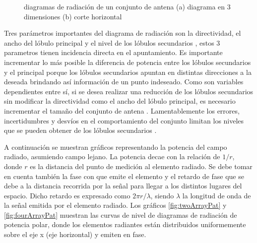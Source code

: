 \begin{figure}[H]
 \centering
	\caption{diagramas de radiación de un conjunto de antena (a) diagrama en 3 dimensiones \cite{arrayPattern} (b) corte horizontal}
 \label{fig:arrayPattern}
\end{figure}

Tres parámetros importantes del diagrama de radiación son la directividad, el ancho del lóbulo principal y el nivel de los
lóbulos secundarios \cite{Hsiao1985}, estos 3 parametros tienen incidencia directa en el apuntamiento. Es importante incrementar
lo más posible la diferencia de potencia entre los lóbulos secundarios y el principal porque los lóbulos secundarios apuntan
en distintas direcciones a la deseada brindando así información de un punto indeseado. Como son variables dependientes entre
sí, si se desea realizar una reducción de los lóbulos secundarios sin modificar la directividad como el ancho del lóbulo 
principal, es necesario incrementar el tamaño del conjunto de antena \cite{Hsiao1985}. 
Lamentablemente los errores, incertidumbres y desvíos en el comportamiento del conjunto limitan los niveles que se pueden 
obtener de los lóbulos secundarios \cite{Hsiao1985}.

A continuación se muestran gráficos representando la potencia del campo radiado, asumiendo campo lejano. La potencia decae
con la relación de $1/r$, donde $r$ es la distancia del punto de medición al elemento radiado. Se debe tomar en cuenta también
la fase con que emite el elemento y el retardo de fase que se debe a la distancia recorrida por la señal para llegar a los 
distintos lugares del espacio. Dicho retardo es expresado como $2\pi r/\lambda$, siendo $\lambda$ la longitud de onda de la 
señal emitida por el elemento radiado. Los gráficos \ref{fig:twoArrayPat} y \ref{fig:fourArrayPat} muestran las curvas de 
nivel de diagramas de radiación de potencia polar, donde los elementos radiantes están distribuidos uniformemente sobre el eje
x (eje horizontal) y emiten en fase.

